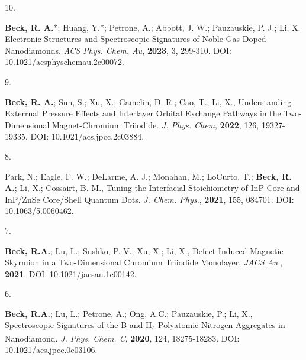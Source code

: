 \begin{cvpublications}


\cvpublication
{10.}
{\parbox[t]{0.95\textwidth}{\strut \textbf{Beck, R. A.}*; Huang, Y.*; Petrone, A.; Abbott, J. W.; Pauzauskie, P. J.; Li, X.
Electronic Structures and Spectroscopic Signatures of Noble-Gas-Doped Nanodiamonds.
\textit{ACS Phys. Chem. Au}, \textbf{2023}, 3, 299-310.
DOI: 10.1021/acsphyschemau.2c00072.}}



\cvpublication
{9.}
{\parbox[t]{0.95\textwidth}{\strut \textbf{Beck, R. A.}; Sun, S.; Xu, X.; Gamelin, D. R.; Cao, T.; Li, X.,
Understanding Exterrnal Pressure Effects and Interlayer Orbital Exchange Pathways in the Two-Dimensional Magnet-Chromium Triiodide.
\textit{J. Phys. Chem}, \textbf{2022}, 126, 19327-19335.
DOI: 10.1021/acs.jpcc.2c03884.}}



\cvpublication
{8.}
{\parbox[t]{0.95\textwidth}{\strut Park, N.; Eagle, F. W.; DeLarme, A. J.; Monahan, M.; LoCurto, T.; \textbf{Beck, R. A.}; Li, X.; Cossairt, B. M.,
Tuning the Interfacial Stoichiometry of InP Core and InP/ZnSe Core/Shell Quantum Dots.
\textit{J. Chem. Phys.}, \textbf{2021}, 155, 084701.
DOI: 10.1063/5.0060462.}}




\cvpublication
{7.}
{\parbox[t]{0.95\textwidth}{\strut \textbf{Beck, R.A.}; Lu, L.; Sushko, P. V.; Xu, X.; Li, X.,
Defect-Induced Magnetic Skyrmion in a Two-Dimensional Chromium Triiodide Monolayer.
\textit{JACS Au.}, \textbf{2021}. 
DOI: 10.1021/jacsau.1c00142.}}




\cvpublication
{6.}
{\parbox[t]{0.95\textwidth}{\strut \textbf{Beck, R.A.}; Lu, L.; Petrone, A.; Ong, A.C.; Pauzauskie, P.; Li, X., 
Spectroscopic Signatures of the B and H\textsubscript{4} Polyatomic Nitrogen Aggregates in Nanodiamond.
\textit{J. Phys. Chem. C}, \textbf{2020}, 124, 18275-18283.
DOI: 10.1021/acs.jpcc.0c03106.}}


\end{cvpublications}
